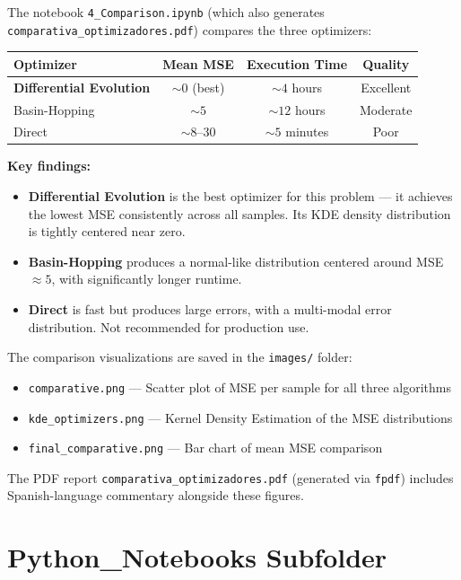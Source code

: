 \documentclass[11pt,a4paper]{article}
\begin{document}
The notebook {\tt 4\_Comparison.ipynb} (which also generates {\tt comparativa\_optimizadores.pdf}) compares the three optimizers:

\begin{table}[htbp]
\centering
\begin{tabular}{lccc}
\toprule
\textbf{Optimizer} & \textbf{Mean MSE} & \textbf{Execution Time} & \textbf{Quality} \\
\midrule
\textbf{Differential Evolution} & $\sim 0$ (best) & $\sim 4$ hours & Excellent \\
Basin-Hopping & $\sim 5$ & $\sim 12$ hours & Moderate \\
Direct & $\sim 8$--$30$ & $\sim 5$ minutes & Poor \\
\bottomrule
\end{tabular}
\end{table}

\textbf{Key findings:}
\begin{itemize}
    \item \textbf{Differential Evolution} is the best optimizer for this problem --- it achieves the lowest MSE consistently across all samples. Its KDE density distribution is tightly centered near zero.
    \item \textbf{Basin-Hopping} produces a normal-like distribution centered around MSE $\approx 5$, with significantly longer runtime.
    \item \textbf{Direct} is fast but produces large errors, with a multi-modal error distribution. Not recommended for production use.
\end{itemize}

The comparison visualizations are saved in the {\tt images/} folder:
\begin{itemize}
    \item {\tt comparative.png} --- Scatter plot of MSE per sample for all three algorithms
    \item {\tt kde\_optimizers.png} --- Kernel Density Estimation of the MSE distributions
    \item {\tt final\_comparative.png} --- Bar chart of mean MSE comparison
\end{itemize}

The PDF report {\tt comparativa\_optimizadores.pdf} (generated via {\tt fpdf}) includes Spanish-language commentary alongside these figures.

\section{Python\_Notebooks Subfolder}
\end{document}
